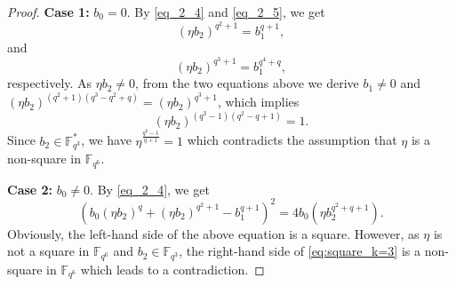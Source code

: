 \documentclass{amsart}
\theoremstyle{plain}
\theoremstyle{definition}
\newcommand{\F}{\mathbb F}
\begin{document}
\begin{proof}
		\medskip
		
		\noindent\textbf{Case 1:} $b_0=0$.
		By \eqref{eq_2_4} and \eqref{eq_2_5}, we get $$(\eta b_2)^{q^2+1}=b_1^{q+1},$$ and $$(\eta b_2)^{q^3+1}=b_1^{q^4+q},$$
		respectively. 
		As $\eta b_2\neq 0$, from the two equations above we derive $b_1\neq 0$ and $(\eta b_2)^{(q^2+1)(q^3-q^2+q)}=(\eta b_2)^{q^3+1}$, which implies $$ (\eta b_2)^{(q^3-1)(q^2-q+1)}=1.$$
		Since $b_2\in\mathbb{F}_{q^3}^*$, we have $\eta ^{\frac{q^6-1}{q+1}}=1$ which contradicts the assumption that $\eta$ is a non-square in $\F_{q^6}$.
		\medskip
		
		\noindent\textbf{Case 2:} $b_0\neq0$. By \eqref{eq_2_4},  we get
		\begin{equation}\label{eq:square_k=3}
			\left(b_0(\eta b_2)^q+(\eta b_2)^{q^2+1}-b_1^{q+1}\right)^2=4b_0(\eta b_2^{q^2+q+1}).
		\end{equation}
		Obviously, the left-hand side of the above equation is a square.
		However, as $\eta$ is not a square in $\F_{q^6}$ and $b_2\in \F_{q^3}$, the right-hand side of \eqref{eq:square_k=3} is a non-square in $\F_{q^6}$ which leads to a contradiction.
	\end{proof}
	
\end{document}
